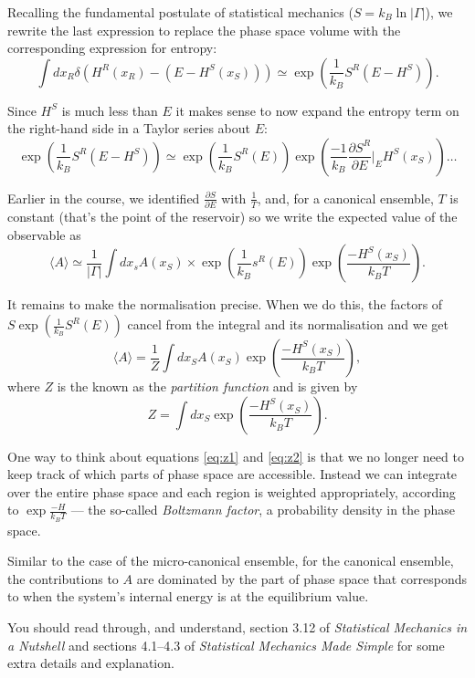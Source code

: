 Recalling the fundamental postulate of statistical mechanics ($S=k_B\ln|\Gamma|$), we rewrite the last expression to replace the phase space volume with the corresponding expression for entropy:
$$
	\int dx_R\delta(H^R(x_R)-(E-H^S(x_S))) \simeq \exp\left(\frac{1}{k_B}S^R(E-H^S)\right).
$$

Since $H^S$ is much less than $E$ it makes sense to now expand the entropy term on the right-hand side in a Taylor series about $E$:
$$
	\exp\left(\frac{1}{k_B}S^R(E-H^S)\right)\simeq \exp\left(\frac{1}{k_B}S^R(E)\right)\exp\left(\frac{-1}{k_B}\frac{\partial S^R}{\partial E}|_E H^S(x_S)\right)\ldots
$$

Earlier in the course, we identified $\frac{\partial S}{\partial E}$ with $\frac{1}{T}$, and, for a canonical ensemble, $T$ is constant (that's the point of the reservoir) so we write the expected value of the observable as
$$
	\langle A\rangle \simeq \frac{1}{|\Gamma|}\int dx_sA(x_S)\times\exp\left(\frac{1}{k_B}s^R(E)\right)\exp\left(\frac{-H^S(x_S)}{k_BT}\right).
$$

It remains to make the normalisation precise. When we do this, the factors of $S\exp\left(\frac{1}{k_B}S^R(E)\right)$ cancel from the integral and its normalisation and we get
\begin{equation}
	\langle A\rangle = \frac{1}{Z}\int dx_SA(x_S)\exp\left(\frac{-H^S(x_S)}{k_BT}\right),
	\label{eq:z1}
\end{equation}
where $Z$ is the known as the \emph{partition function} and is given by
\begin{equation}
	Z = \int dx_S\exp\left(\frac{-H^S(x_S)}{k_BT}\right).
	\label{eq:z2}
\end{equation}

One way to think about equations \ref{eq:z1} and \ref{eq:z2} is that we no longer need to keep track of which parts of phase space are accessible. Instead we can integrate over the entire phase space and each region is weighted appropriately, according to $\exp\frac{-H}{k_BT}$ --- the so-called \emph{Boltzmann factor}, a probability density in the phase space.

Similar to the case of the micro-canonical ensemble, for the canonical ensemble, the contributions to $A$ are dominated by the part of phase space that corresponds to when the system's internal energy is at the equilibrium value. 

You should read through, and understand, section 3.12 of \emph{Statistical Mechanics in a Nutshell} and sections 4.1--4.3 of \emph{Statistical Mechanics Made Simple} for some extra details and explanation.


